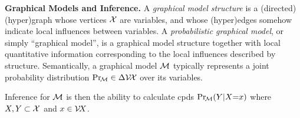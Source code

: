 \documentclass{article}
\newcommand\discard[1]{}
\begin{document}
\textbf{Graphical Models and Inference.}
A \emph{graphical model structure}
is a (directed) (hyper)graph whose vertices $\mathcal X$ are variables, and whose (hyper)edges somehow indicate local influences between variables.
A \emph{probabilistic graphical model},
or simply  ``graphical model'',
is a
graphical model structure
together with local quantitative information corresponding to the local influences described by structure.
%
Semantically,
a graphical model $\cal M$
typically
represents a joint probability distribution $\Pr_{\!\cal M}
 \in \Delta \mathcal V\!\mathcal X$ over its variables.
\discard{
    Although there is often more to the story,
    it can typically be
    expressed as a product
    $\Pr_{\!\cal M}(\X) \propto \prod_{E \in \Ed} \phi_{E}(E)$
    of factors $\boldsymbol\phi = 
    \{ \phi_E : \V E \to \mathbb R_{\ge 0} \}_{E \in \Ed}$
    over a hypergraph $(\X, \Ed)$ closely related to the structure of $\cal M$.
    For this reason, some authors use the term ``graphical model'' to refer to a tuple $(\X ,\Ed, \boldsymbol\phi)$,
    i.e., a factor graph.
    PDGs, however, do not represent probabilities this way.}
Inference for $\cal M$ is then the ability to calculate cpds $\Pr_{\!\cal M}(Y|X{=}x)$
where $X,Y \subset \mathcal X$ and $x \in \mathcal V\! X$. 
\end{document}

